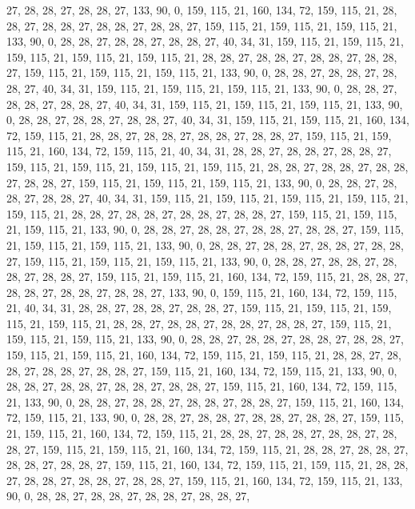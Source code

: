 27, 28, 28, 27, 28, 28, 27, 133, 90, 0, 159, 115, 21, 160, 134, 72, 159, 115, 21, 28, 28, 27, 28, 28, 27, 28, 28, 27, 28, 28, 27, 159, 115, 21, 159, 115, 21, 159, 115, 21, 133, 90, 0, 28, 28, 27, 28, 28, 27, 28, 28, 27, 40, 34, 31, 159, 115, 21, 159, 115, 21, 159, 115, 21,
159, 115, 21, 159, 115, 21, 28, 28, 27, 28, 28, 27, 28, 28, 27, 28, 28, 27, 159, 115, 21, 159, 115, 21, 159, 115, 21, 133, 90, 0, 28, 28, 27, 28, 28, 27, 28, 28, 27, 40, 34, 31, 159, 115, 21, 159, 115, 21, 159, 115, 21, 133, 90, 0, 28, 28, 27, 28, 28, 27, 28, 28, 27, 40,
34, 31, 159, 115, 21, 159, 115, 21, 159, 115, 21, 133, 90, 0, 28, 28, 27, 28, 28, 27, 28, 28, 27, 40, 34, 31, 159, 115, 21, 159, 115, 21, 160, 134, 72, 159, 115, 21, 28, 28, 27, 28, 28, 27, 28, 28, 27, 28, 28, 27, 159, 115, 21, 159, 115, 21, 160, 134, 72, 159, 115, 21, 40, 34,
31, 28, 28, 27, 28, 28, 27, 28, 28, 27, 159, 115, 21, 159, 115, 21, 159, 115, 21, 159, 115, 21, 28, 28, 27, 28, 28, 27, 28, 28, 27, 28, 28, 27, 159, 115, 21, 159, 115, 21, 159, 115, 21, 133, 90, 0, 28, 28, 27, 28, 28, 27, 28, 28, 27, 40, 34, 31, 159, 115, 21, 159, 115, 21,
159, 115, 21, 159, 115, 21, 159, 115, 21, 28, 28, 27, 28, 28, 27, 28, 28, 27, 28, 28, 27, 159, 115, 21, 159, 115, 21, 159, 115, 21, 133, 90, 0, 28, 28, 27, 28, 28, 27, 28, 28, 27, 28, 28, 27, 159, 115, 21, 159, 115, 21, 159, 115, 21, 133, 90, 0, 28, 28, 27, 28, 28, 27, 28,
28, 27, 28, 28, 27, 159, 115, 21, 159, 115, 21, 159, 115, 21, 133, 90, 0, 28, 28, 27, 28, 28, 27, 28, 28, 27, 28, 28, 27, 159, 115, 21, 159, 115, 21, 160, 134, 72, 159, 115, 21, 28, 28, 27, 28, 28, 27, 28, 28, 27, 28, 28, 27, 133, 90, 0, 159, 115, 21, 160, 134, 72, 159, 115,
21, 40, 34, 31, 28, 28, 27, 28, 28, 27, 28, 28, 27, 159, 115, 21, 159, 115, 21, 159, 115, 21, 159, 115, 21, 28, 28, 27, 28, 28, 27, 28, 28, 27, 28, 28, 27, 159, 115, 21, 159, 115, 21, 159, 115, 21, 133, 90, 0, 28, 28, 27, 28, 28, 27, 28, 28, 27, 28, 28, 27, 159, 115, 21,
159, 115, 21, 160, 134, 72, 159, 115, 21, 159, 115, 21, 28, 28, 27, 28, 28, 27, 28, 28, 27, 28, 28, 27, 159, 115, 21, 160, 134, 72, 159, 115, 21, 133, 90, 0, 28, 28, 27, 28, 28, 27, 28, 28, 27, 28, 28, 27, 159, 115, 21, 160, 134, 72, 159, 115, 21, 133, 90, 0, 28, 28, 27, 28,
28, 27, 28, 28, 27, 28, 28, 27, 159, 115, 21, 160, 134, 72, 159, 115, 21, 133, 90, 0, 28, 28, 27, 28, 28, 27, 28, 28, 27, 28, 28, 27, 159, 115, 21, 159, 115, 21, 160, 134, 72, 159, 115, 21, 28, 28, 27, 28, 28, 27, 28, 28, 27, 28, 28, 27, 159, 115, 21, 159, 115, 21, 160, 134,
72, 159, 115, 21, 28, 28, 27, 28, 28, 27, 28, 28, 27, 28, 28, 27, 159, 115, 21, 160, 134, 72, 159, 115, 21, 159, 115, 21, 28, 28, 27, 28, 28, 27, 28, 28, 27, 28, 28, 27, 159, 115, 21, 160, 134, 72, 159, 115, 21, 133, 90, 0, 28, 28, 27, 28, 28, 27, 28, 28, 27, 28, 28, 27,
